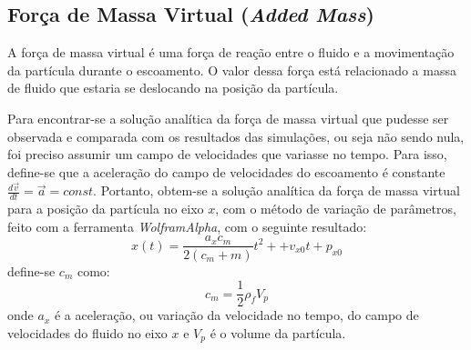 \subsection{\textbf{Força de Massa Virtual (\textit{Added Mass})}}
\label{sec_mass}
A força de massa virtual é uma força de reação entre o fluido e a movimentação da partícula durante o escoamento.
O valor dessa força está relacionado a massa de fluido que estaria se deslocando na posição da partícula.

Para encontrar-se a solução analítica da força de massa virtual que pudesse ser observada e comparada com os resultados das simulações, ou seja não sendo nula, foi preciso assumir um campo de velocidades que variasse no tempo.
Para isso, define-se que a aceleração do campo de velocidades do escoamento é constante $\tfrac{d\vec{v}}{dt}=\vec{a}=const$.
Portanto, obtem-se a solução analítica da força de massa virtual para a posição da partícula no eixo $x$, com o método de variação de parâmetros, feito com a ferramenta \textit{WolframAlpha}, com o seguinte resultado:
\begin{equation}
    x(t) = \dfrac{a_x c_m}{2(c_m + m)}t^2 + + v_{x0}t + p_{x0}
    \label{mass_sol} 
\end{equation}
define-se $c_m$ como:
\begin{equation}
    c_m = \dfrac{1}{2} \rho_f V_p
    \label{mass_c} 
\end{equation}
onde $a_x$ é a aceleração, ou variação da velocidade no tempo, do campo de velocidades do fluido no eixo $x$ e $V_p$ é o volume da partícula.

